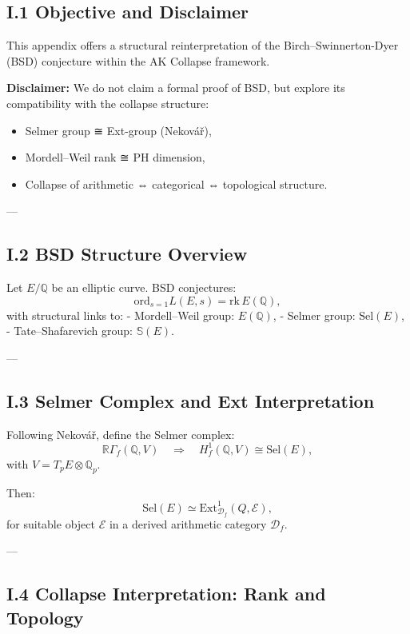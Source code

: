 \documentclass[11pt]{article}
\newcommand{\Sha}{\mathbb{S}}
\begin{document}
\subsection*{I.1 Objective and Disclaimer}

This appendix offers a structural reinterpretation of the Birch–Swinnerton-Dyer (BSD) conjecture  
within the AK Collapse framework.  

\textbf{Disclaimer:}  
We do not claim a formal proof of BSD, but explore its compatibility with the collapse structure:
\begin{itemize}
  \item Selmer group ≅ Ext-group (Nekovář),
  \item Mordell–Weil rank ≅ PH dimension,
  \item Collapse of arithmetic ⇔ categorical ⇔ topological structure.
\end{itemize}

---

\subsection*{I.2 BSD Structure Overview}

Let $E/\mathbb{Q}$ be an elliptic curve. BSD conjectures:
\[
\mathrm{ord}_{s=1} L(E,s) = \mathrm{rk}\,E(\mathbb{Q}),
\]
with structural links to:
- Mordell–Weil group: $E(\mathbb{Q})$,
- Selmer group: $\mathrm{Sel}(E)$,
- Tate–Shafarevich group: $\Sha(E)$.

---

\subsection*{I.3 Selmer Complex and Ext Interpretation}

Following Nekovář, define the Selmer complex:
\[
\mathbb{R}\Gamma_f(\mathbb{Q}, V) \quad \Rightarrow \quad H^1_f(\mathbb{Q}, V) \cong \mathrm{Sel}(E),
\]
with $V = T_p E \otimes \mathbb{Q}_p$.

Then:
\[
\mathrm{Sel}(E) \simeq \mathrm{Ext}^1_{\mathcal{D}_f}(Q, \mathcal{E}),
\]
for suitable object $\mathcal{E}$ in a derived arithmetic category $\mathcal{D}_f$.

---

\subsection*{I.4 Collapse Interpretation: Rank and Topology}
\end{document}
